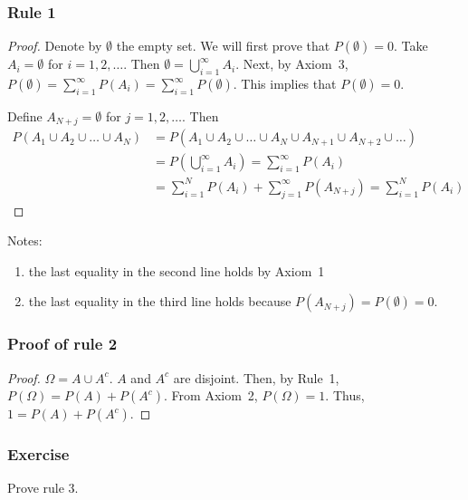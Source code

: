 \begin{frame}
    \frametitle{Rule 1}

	\footnotesize
	\begin{proof}
		Denote by $\emptyset$ the empty set. We will first prove that
        $P(\emptyset)=0$. Take $A_i=\emptyset$ for $i=1, 2, \ldots$. Then
        $\emptyset=\bigcup_{i=1}^\infty A_i$. Next, by Axiom~3, $P(\emptyset)=\sum_{i=1}^\infty P(A_i)=\sum_{i=1}^\infty P(\emptyset)$. This implies that $P(\emptyset)=0$.

		Define $A_{N+j}=\emptyset$ for $j=1,2,\ldots$. Then
		\footnotesize
		\begin{align*}
            P(A_1\cup A_2\cup\ldots\cup A_N)&=P(A_1\cup A_2\cup\ldots\cup A_N\cup A_{N+1}\cup A_{N+2}\cup\ldots)\\
										    &=P(\bigcup_{i=1}^\infty A_i)=\sum_{i=1}^\infty P(A_i)\\
                                            &=\sum_{i=1}^N P(A_i)+\sum_{j=1}^\infty P(A_{N+j})=\sum_{i=1}^N P(A_i)
		\end{align*}
		\normalsize

	\end{proof}

	Notes:
	\begin{enumerate}
		\item the last equality in the second line holds by Axiom~1
		\item the last equality in the third line holds because $P(A_{N+j})=P(\emptyset)=0$.
	\end{enumerate}
    \normalsize

\end{frame}

\begin{frame}
    \frametitle{Proof of rule 2}

	\begin{proof}

		$\Omega=A\cup A^c$. $A$ and $A^c$ are disjoint. Then, by Rule~1, $P(\Omega)=P(A)+P(A^c)$. From Axiom~2, $P(\Omega)=1$. Thus, $1=P(A)+P(A^c)$.

	\end{proof}

\end{frame}

\begin{frame}
    \frametitle{Exercise}

    Prove rule 3.

\end{frame}

